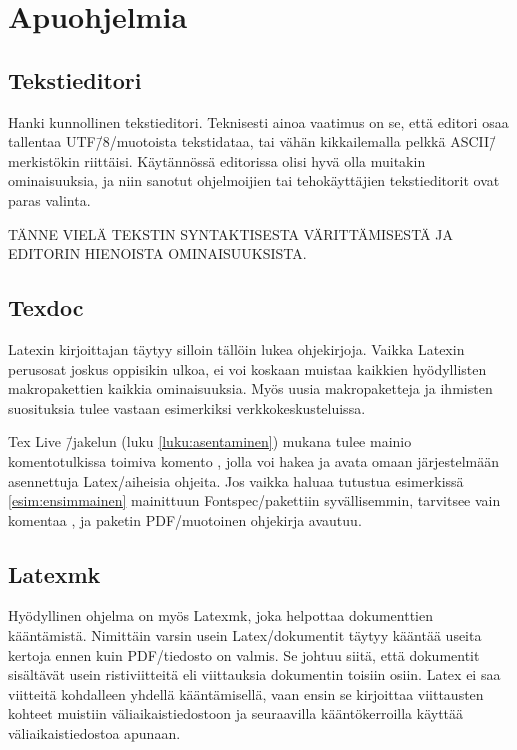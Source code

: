 \section{Apuohjelmia}

\subsection{Tekstieditori}

Hanki kunnollinen teksti\-editori. Teknisesti ainoa vaatimus on se, että
editori osaa tallentaa UTF\=/8\-/muotoista tekstidataa, tai vähän
kikkailemalla pelkkä ASCII\=/merkistökin riittäisi. Käytännössä
editorissa olisi hyvä olla muitakin ominaisuuksia, ja niin sanotut
ohjelmoijien tai tehokäyttäjien teksti\-editorit ovat paras valinta.

TÄNNE VIELÄ TEKSTIN SYNTAKTISESTA VÄRITTÄMISESTÄ JA EDITORIN HIENOISTA
OMINAISUUKSISTA.

\subsection{Texdoc}

Latexin kirjoittajan täytyy silloin tällöin lukea ohjekirjoja. Vaikka
Latexin perus\-osat joskus oppisikin ulkoa, ei voi koskaan muistaa
kaikkien hyödyllisten makropakettien kaikkia ominaisuuksia. Myös uusia
makropaketteja ja ihmisten suosituksia tulee vastaan esimerkiksi
verkkokeskusteluissa.

Tex Live \=/jakelun (luku \ref{luku:asentaminen}) mukana tulee mainio
komentotulkissa toimiva komento , jolla voi hakea ja avata
omaan järjestelmään asennettuja Latex\-/aiheisia ohjeita. Jos vaikka
haluaa tutustua esimerkissä \ref{esim:ensimmainen} mainittuun
Fontspec\-/pakettiin syvällisemmin, tarvitsee vain komentaa
, ja paketin PDF\-/muotoinen ohjekirja avautuu.

\subsection{Latexmk}

Hyödyllinen ohjelma on myös Latexmk, joka helpottaa dokumenttien
kääntämistä. Nimittäin varsin usein Latex\-/dokumentit täytyy kääntää
useita kertoja ennen kuin PDF\-/tiedosto on valmis. Se johtuu siitä,
että dokumentit sisältävät usein ristiviitteitä eli viittauksia
dokumentin toisiin osiin. Latex ei saa viitteitä kohdalleen yhdellä
kääntämisellä, vaan ensin se kirjoittaa viittausten kohteet muistiin
väli\-aikais\-tiedostoon ja seuraavilla kääntökerroilla käyttää
väli\-aikais\-tiedostoa apunaan.

